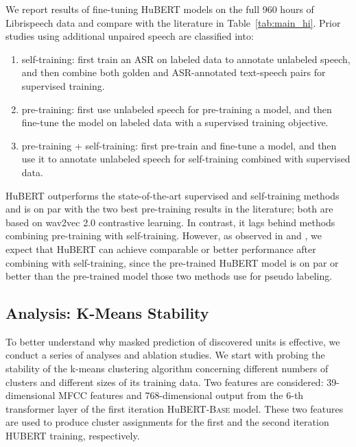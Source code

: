 We report results of fine-tuning HuBERT models on the full 960 hours of Librispeech data and compare with the literature in Table~\ref{tab:main_hi}. Prior studies using additional unpaired speech are classified into:

\begin{enumerate}
    \item self-training: first train an ASR on labeled data to annotate unlabeled speech, and then combine both golden and ASR-annotated text-speech pairs for supervised training.
    \item pre-training: first use unlabeled speech for pre-training a model, and then fine-tune the model on labeled data with a supervised training objective.
    \item pre-training + self-training: first pre-train and fine-tune a model, and then use it to annotate unlabeled speech for self-training combined with supervised data.
\end{enumerate}

HuBERT outperforms the state-of-the-art supervised and self-training methods and is on par with the two best pre-training results in the literature; both are based on wav2vec 2.0 contrastive learning. In contrast, it lags behind methods combining pre-training with self-training. However, as observed in \cite{xu2020self} and \cite{zhang2020pushing}, we expect that HuBERT can achieve comparable or better performance after combining with self-training, since the pre-trained HuBERT model is on par or better than the pre-trained model those two methods use for pseudo labeling.

\subsection{Analysis: K-Means Stability} To better understand why masked prediction of discovered units is effective, we conduct a series of analyses and ablation studies. We start with probing the stability of the k-means clustering algorithm concerning different numbers of clusters and different sizes of its training data. Two features are considered: 39-dimensional MFCC features and 768-dimensional output from the 6-th transformer layer of the first iteration HuBERT-\textsc{Base} model. These two features are used to produce cluster assignments for the first and the second iteration HUBERT training, respectively.

